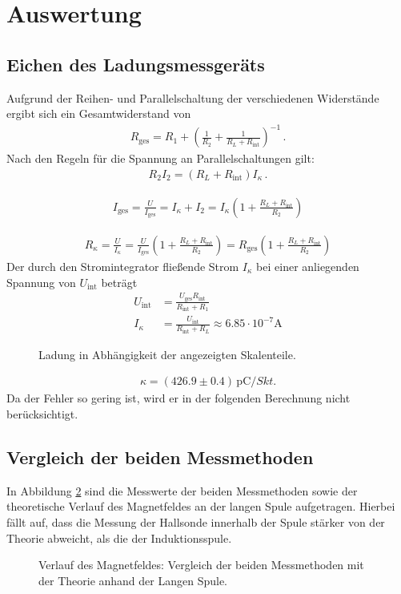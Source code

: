 \documentclass[12pt,a4paper,titlepage,headinclude,bibtotoc]{scrartcl}
\begin{document}
\section{Auswertung}
\label{sec:auswertung}
\subsection{Eichen des Ladungsmessgeräts}
Aufgrund der Reihen- und Parallelschaltung der verschiedenen Widerstände ergibt sich ein Gesamtwiderstand von 
\begin{align}
		R_\text{ges}=R_1+\left(\frac{1}{R_2}+\frac{1}{R_L+R_\text{int}}\right)^{-1}\,.
\end{align}
Nach den Regeln für die Spannung an Parallelschaltungen gilt:
\begin{align*}
	R_2 I_2=(R_L+R_\text{int})I_\kappa\,.
\end{align*}

\begin{align*}
	I_\text{ges}=\frac{U}{I_\text{ges}}=I_\kappa+I_2=I_\kappa\left(1+\frac{R_L+R_\text{int}}{R_2}\right)
\end{align*}

\begin{align}
	R_\kappa=\frac{U}{I_\kappa}=\frac{U}{I_\text{ges}}\left(1+\frac{R_L+R_\text{int}}{R_2}\right)=R_\text{ges}\left(1+\frac{R_L+R_\text{int}}{R_2}\right)
\end{align}
Der durch den Stromintegrator fließende Strom $I_\kappa$ bei einer anliegenden Spannung von $U_\text{int}$ beträgt
\begin{align}
	U_\text{int}&=\frac{U_\text{ges}R_\text{int}}{R_\text{int}+R_1}\\
	I_\kappa&=\frac{U_\text{int}}{R_\text{int}+R_L}\approx 6.85\cdot 10^{-7}\si\ampere
\end{align}
\begin{figure}[!htb]
	\centering
	
	\caption{Ladung in Abhängigkeit der angezeigten Skalenteile.}
	\label{fig:Eichen}
\end{figure}

\begin{align}
	\kappa=(426.9 \pm 0.4)\,\si{\pico\coulomb\per Skt.}
\end{align}
Da der Fehler so gering ist, wird er in der folgenden Berechnung nicht berücksichtigt.
\subsection{Vergleich der beiden Messmethoden}
In Abbildung \ref{fig:LangIndHall} sind die Messwerte der beiden Messmethoden sowie der theoretische Verlauf des Magnetfeldes an der langen Spule aufgetragen.
Hierbei fällt auf, dass die Messung der Hallsonde innerhalb der Spule stärker von der Theorie abweicht, als die der Induktionsspule.
\begin{figure}[!htb]
	\centering
	
	\caption{Verlauf des Magnetfeldes: Vergleich der beiden Messmethoden mit der Theorie anhand der Langen Spule.}
	\label{fig:LangIndHall}
\end{figure}
\end{document}
